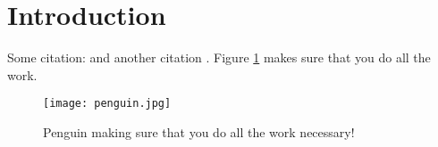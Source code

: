 \section{Introduction}\label{sec:introduction}

Some citation: \cite{scikit-learn} and another citation \cite{Goodfellow2016}. Figure \ref{fig:penguin} makes sure that you do all the work. 


\begin{figure}
    \texttt{[image: penguin.jpg]}
    \label{fig:penguin}
    \caption{Penguin making sure that you do all the work necessary!}
\end{figure}